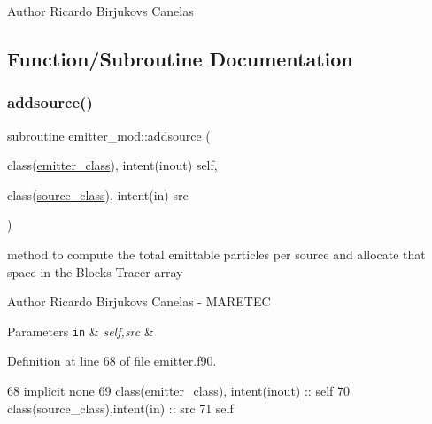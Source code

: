 \begin{DoxyAuthor}{Author}
Ricardo Birjukovs Canelas 
\end{DoxyAuthor}


\subsection{Function/\+Subroutine Documentation}
\mbox{\label{namespaceemitter__mod_ab704fb0e2eb9b3b4b9542706b6fb4eaf}} 
\subsubsection{\texorpdfstring{addsource()}{addsource()}}
{\footnotesize\ttfamily subroutine emitter\+\_\+mod\+::addsource (\begin{DoxyParamCaption}\item[{class(\mbox{\hyperlink{structemitter__mod_1_1emitter__class}{emitter\+\_\+class}}), intent(inout)}]{self,  }\item[{class(\mbox{\hyperlink{structsources__mod_1_1source__class}{source\+\_\+class}}), intent(in)}]{src }\end{DoxyParamCaption})\hspace{0.3cm}{\ttfamily [private]}}



method to compute the total emittable particles per source and allocate that space in the Blocks Tracer array 

\begin{DoxyAuthor}{Author}
Ricardo Birjukovs Canelas -\/ M\+A\+R\+E\+T\+EC 
\end{DoxyAuthor}

\begin{DoxyParams}[1]{Parameters}
\mbox{\tt in}  & {\em self,src} & \\
\hline
\end{DoxyParams}


Definition at line 68 of file emitter.\+f90.


\begin{DoxyCode}
68     \textcolor{keywordtype}{implicit none}
69     \textcolor{keywordtype}{class}(emitter\_class), \textcolor{keywordtype}{intent(inout)} :: self
70     \textcolor{keywordtype}{class}(source\_class),\textcolor{keywordtype}{intent(in)} :: src
71     self%
\end{DoxyCode}
\mbox{\label{namespaceemitter__mod_ae620ebb6a0515272d2f3aa12a88e983a}} 

